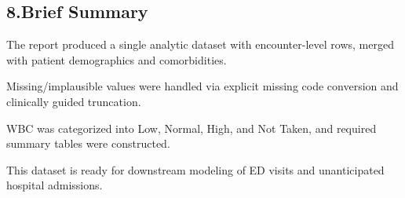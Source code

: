 \documentclass[
  letterpaper,
  DIV=11,
  numbers=noendperiod]{scrartcl}
\begin{document}
\subsection{8.Brief Summary}\label{brief-summary}

The report produced a single analytic dataset with encounter-level rows,
merged with patient demographics and comorbidities.

Missing/implausible values were handled via explicit missing code
conversion and clinically guided truncation.

WBC was categorized into Low, Normal, High, and Not Taken, and required
summary tables were constructed.

This dataset is ready for downstream modeling of ED visits and
unanticipated hospital admissions.
\end{document}
